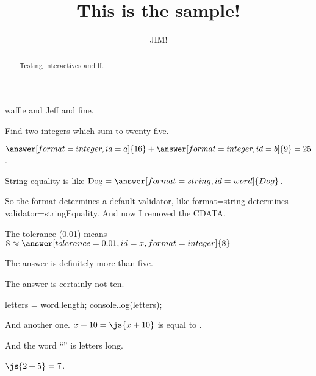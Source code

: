 \documentclass{ximera}
\title{This is the sample!}
\author{JIM!}
\begin{document}
\begin{abstract}
Testing interactives and ff.
\end{abstract}
\maketitle

waffle and Jeff and fine.


\begin{problem}
  Find two integers which sum to twenty five.

  \begin{validator}[a+b==25]
    $\answer[format=integer,id=a]{16} + \answer[format=integer,id=b]{9} = 25$.
  \end{validator}
\end{problem}

\begin{problem}
  String equality is like $\mbox{Dog} = \answer[format=string,id=word]{Dog}$.

  So the format determines a default validator, like format=string determines validator=stringEquality.  And now I removed the CDATA.
\end{problem}

\begin{problem}
  The tolerance (0.01) means $8 \approx \answer[tolerance=0.01,id=x,format=integer]{8}$
  
  \begin{feedback}
    The answer is definitely more than five.
  \end{feedback}

  \begin{feedback}[x==10]
    The answer is certainly not ten.
  \end{feedback}
\end{problem}

\begin{javascript}
  letters = word.length;
  console.log(letters);
\end{javascript}

And another one.  $x + 10 = \js{x+10}$ is equal to .

And the word ``'' is  letters long.

$\js{2+5} = 7$.
\end{document}
